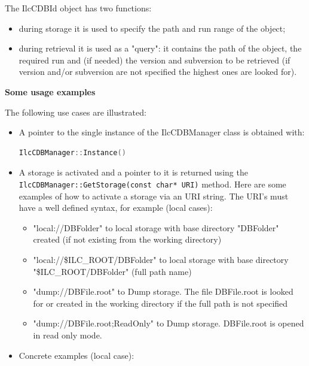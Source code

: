\documentclass[12pt,a4paper,twoside]{article}
\newcommand{\method}[1]{\texttt{#1}\xspace}
\begin{document}
{\begin{itemize}
  The IlcCDBId object has two functions:
  \begin{itemize}
  \item during storage it is used to specify the path and run range of the 
    object;
  \item during retrieval it is used as a "query": it contains the
    path of the object, the required run and (if needed) the
    version and subversion to be retrieved (if version and/or
    subversion are not specified the highest ones are looked for).
  \end{itemize}
\end{itemize}

\noindent
\textbf{Some usage examples}

The following use cases are illustrated: 

\begin{itemize}
\item A pointer to the single instance of the IlcCDBManager class is obtained 
  with:

  \begin{lstlisting}[language=C++]
    IlcCDBManager::Instance()
  \end{lstlisting}

\item A storage is activated and a pointer to it is returned using the 
  \method{IlcCDBManager::GetStorage(const char* URI)} method. Here are
  some examples of how to activate a storage via an URI string. The
  URI's must have a  well defined syntax, for example (local cases):
  
  \begin{itemize}
  \item "local://DBFolder" to local storage with base directory "DBFolder" 
    created (if not existing from the working directory) 

  \item "local://\$ILC\_ROOT/DBFolder" to local storage with base directory 
    "\$ILC\_ROOT/DBFolder" (full path name)

  \item"dump://DBFile.root" to Dump storage. The file DBFile.root is looked 
    for or created in the working directory if the full path is not specified

  \item "dump://DBFile.root;ReadOnly" to Dump storage. DBFile.root is
    opened in   read only mode.
  \end{itemize}

\item Concrete examples (local case):
  

\end{itemize}}
\end{document}
